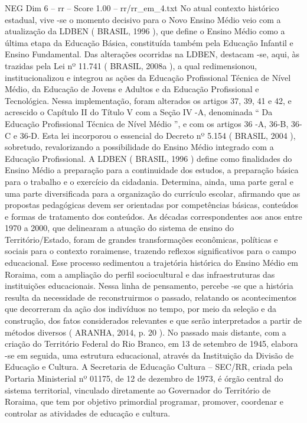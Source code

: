 \begin{textsample}{NEG Dim 6 – rr – Score 1.00 – rr/rr\_em\_4.txt}
No atual contexto histórico estadual, vive -se o momento decisivo para o Novo Ensino Médio veio com a atualização da LDBEN ( BRASIL, 1996 ), que define o Ensino Médio como a última etapa da Educação Básica, constituída também pela Educação Infantil e Ensino Fundamental.
Das alterações ocorridas na LDBEN, destacam -se, aqui, às trazidas pela Lei nº 11.741 ( BRASIL, 2008a ), a qual redimensionou, institucionalizou e integrou as ações da Educação Profissional Técnica de Nível Médio, da Educação de Jovens e Adultos e da Educação Profissional e Tecnológica.
Nessa implementação, foram alterados os artigos 37, 39, 41 e 42, e acrescido o Capítulo II do Título V com a Seção IV -A, denominada “ Da Educação Profissional Técnica de Nível Médio ”, e com os artigos 36 -A, 36-B, 36-C e 36-D.
Esta lei incorporou o essencial do Decreto nº 5.154 ( BRASIL, 2004 ), sobretudo, revalorizando a possibilidade do Ensino Médio integrado com a Educação Profissional.
A LDBEN ( BRASIL, 1996 ) define como finalidades do Ensino Médio a preparação para a continuidade dos estudos, a preparação básica para o trabalho e o exercício da cidadania.
Determina, ainda, uma parte geral e uma parte diversificada para a organização do currículo escolar, afirmando que as propostas pedagógicas devem ser orientadas por competências básicas, conteúdos e formas de tratamento dos conteúdos.
As décadas correspondentes aos anos entre 1970 a 2000, que delinearam a atuação do sistema de ensino do Território/Estado, foram de grandes transformações econômicas, políticas e sociais para o contexto roraimense, trazendo reflexos significativos para o campo educacional.
Esse processo sedimentou a trajetória histórica do Ensino Médio em Roraima, com a ampliação do perfil sociocultural e das infraestruturas das instituições educacionais.
Nessa linha de pensamento, percebe -se que a história resulta da necessidade de reconstruirmos o passado, relatando os acontecimentos que decorreram da ação dos indivíduos no tempo, por meio da seleção e da construção, dos fatos considerados relevantes e que serão interpretados a partir de métodos diversos ( ARANHA, 2014, p. 20 ).
No passado mais distante, com a criação do Território Federal do Rio Branco, em 13 de setembro de 1945, elabora -se em seguida, uma estrutura educacional, através da Instituição da Divisão de Educação e Cultura.
A Secretaria de Educação Cultura – SEC/RR, criada pela Portaria Ministerial nº 01175, de 12 de dezembro de 1973, é órgão central do sistema territorial, vinculado diretamente ao Governador do Território de Roraima, que tem por objetivo primordial programar, promover, coordenar e controlar as atividades de educação e cultura.

\end{textsample}
